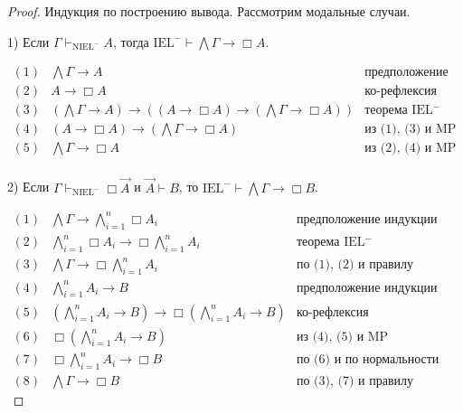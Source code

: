 \begin{proof}
Индукция по построению вывода. Рассмотрим модальные случаи.

\vspace{\baselineskip}

1) Если $\Gamma \vdash_{\text{NIEL}^{-}} A$, тогда $\text{IEL}^{-} \vdash \bigwedge \Gamma \rightarrow \Box A$.

$\begin{array}{lll}
(1) & \bigwedge \Gamma \rightarrow A & \text{предположение индукции}\\
(2) & A \rightarrow \Box A &\text{ко-рефлексия}\\
(3) & (\bigwedge \Gamma \rightarrow A) \rightarrow ((A \rightarrow \Box A) \rightarrow (\bigwedge \Gamma \rightarrow \Box A))&\text{теорема IEL$^{-}$}\\
(4) & (A \rightarrow \Box A) \rightarrow (\bigwedge \Gamma \rightarrow \Box A) &\text{из (1), (3) и MP}\\
(5) & \bigwedge \Gamma \rightarrow \Box A &\text{из (2), (4) и MP}\\
\end{array}$

\vspace{\baselineskip}

2) Если $\Gamma \vdash_{\text{NIEL}^{-}} \Box \vec{A}$ и $\vec{A} \vdash B$, то $\text{IEL}^{-} \vdash \bigwedge \Gamma \rightarrow \Box B$.

$\begin{array}{lll}
(1) &\bigwedge \Gamma \rightarrow \bigwedge \limits_{i = 1}^{n} \Box A_i & \text{предположение индукции} \\
(2) &\bigwedge \limits_{i = 1}^{n} \Box A_i \rightarrow \Box \bigwedge \limits_{i = 1}^{n} A_i& \text{теорема IEL$^{-}$} \\
(3) &\bigwedge \Gamma \rightarrow \Box \bigwedge \limits_{i = 1}^{n} A_i & \text{по (1), (2) и правилу силлогизма} \\
(4) &\bigwedge \limits_{i = 1}^{n} A_i \rightarrow B& \text{предположение индукции} \\
(5) &(\bigwedge \limits_{i = 1}^{n} A_i \rightarrow B) \rightarrow \Box (\bigwedge \limits_{i = 1}^{n} A_i \rightarrow B)& \text{ко-рефлексия}\\
(6) &\Box (\bigwedge \limits_{i = 1}^{n} A_i \rightarrow B)& \text{из (4), (5) и MP} \\
(7) &\Box \bigwedge \limits_{i = 1}^{n} A_i \rightarrow \Box B & \text{по (6) и по нормальности} \\
(8) &\bigwedge \Gamma \rightarrow \Box B & \text{по (3), (7) и правилу силлогизма}
\end{array}$

\end{proof}

